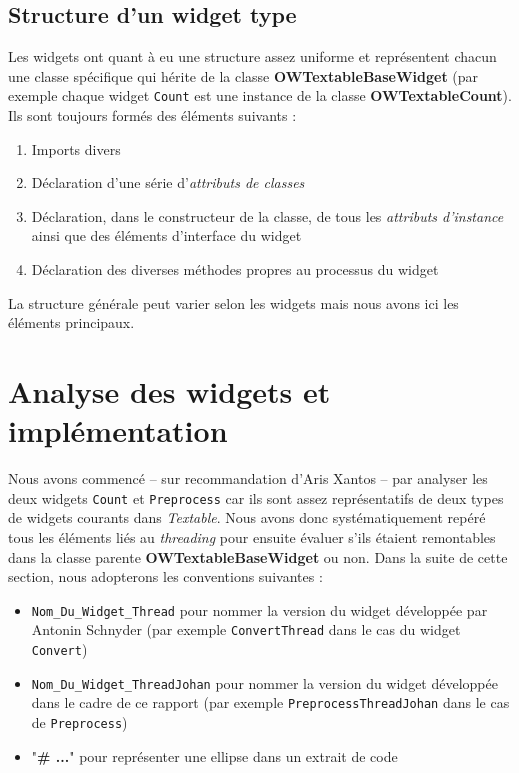 \documentclass{article}
\begin{document}
\subsection{Structure d'un widget type}

Les widgets ont quant à eu une structure assez uniforme et représentent chacun une classe spécifique qui hérite de la classe \textbf{OWTextableBaseWidget} (par exemple chaque widget \texttt{Count} est une instance de la classe \textbf{OWTextableCount}). Ils sont toujours formés des éléments suivants : 

\begin{enumerate}
    \item Imports divers
    \item Déclaration d'une série d'\textit{attributs de classes}
    \item Déclaration, dans le constructeur de la classe, de tous les \textit{attributs d'instance} ainsi que des éléments d'interface du widget
    \item Déclaration des diverses méthodes propres au processus du widget
\end{enumerate}

La structure générale peut varier selon les widgets mais nous avons ici les éléments principaux.

\section{Analyse des widgets et implémentation}

Nous avons commencé – sur recommandation d'Aris Xantos – par analyser les deux widgets \texttt{Count} et \texttt{Preprocess} car ils sont assez représentatifs de deux types de widgets courants dans \textit{Textable}. Nous avons donc systématiquement repéré tous les éléments liés au \textit{threading} pour ensuite évaluer s'ils étaient remontables dans la classe parente \textbf{OWTextableBaseWidget} ou non. Dans la suite de cette section, nous adopterons les conventions suivantes : 

\begin{itemize}
    \item \texttt{Nom\_Du\_Widget\_Thread} pour nommer la version du widget développée par Antonin Schnyder (par exemple \texttt{ConvertThread} dans le cas du widget \texttt{Convert})
    \item \texttt{Nom\_Du\_Widget\_ThreadJohan} pour nommer la version du widget  développée dans le cadre de ce rapport (par exemple \texttt{PreprocessThreadJohan} dans le cas de \texttt{Preprocess})
    \item "\textbf{\# ...}" pour représenter une ellipse dans un extrait de code
\end{itemize}
\end{document}
